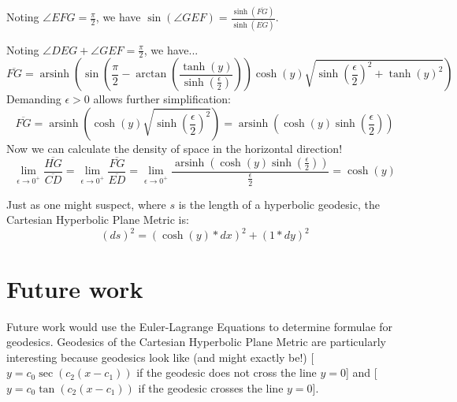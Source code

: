 \documentclass[]{article}
\DeclareMathOperator{\arsinh}{arsinh}
\newcommand{\pqty}[1]{{\left(#1\right)}}
\numberwithin{equation}{section}
\begin{document}
	Noting $\angle{EFG}=\frac{\pi}{2}$, we have $\sin\pqty{\angle{GEF}}=\frac{\sinh\pqty{\overline{FG}}}{\sinh\pqty{\overline{EG}}}$.
	
	Noting $\angle{DEG}+\angle{GEF}=\frac{\pi}{2}$, we have...
	$$\overline{FG} = \arsinh\pqty{
		\sin\pqty{\frac{\pi}{2}-\arctan\pqty{\frac{\tanh\pqty{y}}{\sinh\pqty{\frac{\epsilon}{2}}}}}
		\cosh\pqty{y}
		\sqrt{\sinh\pqty{\frac{\epsilon}{2}}^2+\tanh\pqty{y}^2}
	}$$
	Demanding $\epsilon>0$ allows further simplification:
	$$\overline{FG} = \arsinh\pqty{
		\cosh\pqty{y}
		\sqrt{\sinh\pqty{\frac{\epsilon}{2}}^2}
	} = \arsinh\pqty{
		\cosh\pqty{y}
		\sinh\pqty{\frac{\epsilon}{2}}
	}$$
	Now we can calculate the density of space in the horizontal direction!
	$$
	\lim\limits_{\epsilon\to 0^+}\frac{\overline{HG}}{\overline{CD}}=
	\lim\limits_{\epsilon\to 0^+}\frac{\overline{FG}}{\overline{ED}}=
	\lim\limits_{\epsilon\to 0^+}\frac{\arsinh\pqty{
			\cosh\pqty{y}
			\sinh\pqty{\frac{\epsilon}{2}}
	}}{\frac{\epsilon}{2}}
	=\cosh\pqty{y}
	$$
	
	Just as one might suspect, where $s$ is the length of a hyperbolic geodesic, the Cartesian Hyperbolic Plane Metric is:
	$$\pqty{ds}^2=\pqty{\cosh\pqty{y}*dx}^2+\pqty{1*dy}^2$$
	
	\section{Future work}
	Future work would use the Euler-Lagrange Equations to determine formulae for geodesics. Geodesics of the Cartesian Hyperbolic Plane Metric are particularly interesting because geodesics look like (and might exactly be!) [$y=c_0\sec\pqty{c_2\pqty{x-c_1}}$ if the geodesic does not cross the line $y=0$] and [$y=c_0\tan\pqty{c_2\pqty{x-c_1}}$ if the geodesic crosses the line $y=0$].
\end{document}
